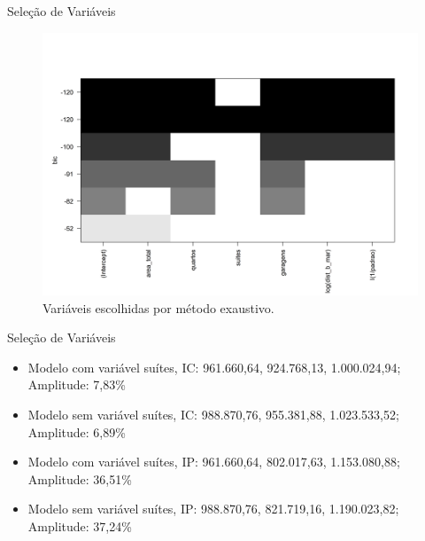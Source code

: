 \documentclass[9pt,ignorenonframetext,aspectratio=169]{beamer}
\providecommand{\tightlist}{%
  \setlength{\itemsep}{0pt}\setlength{\parskip}{0pt}}
\begin{document}
\begin{frame}{Seleção de Variáveis}
\protect\hypertarget{seleuxe7uxe3o-de-variuxe1veis-3}{}

\begin{figure}

{\centering \includegraphics[width=0.7\linewidth]{images/regsub-1} 

}

\caption{Variáveis escolhidas por método exaustivo.}\label{fig:regsub}
\end{figure}

\end{frame}

\begin{frame}{Seleção de Variáveis}
\protect\hypertarget{seleuxe7uxe3o-de-variuxe1veis-4}{}

\begin{itemize}[<+->]
\tightlist
\item
  Modelo com variável suítes, IC: 961.660,64, 924.768,13, 1.000.024,94;
  Amplitude: 7,83\%
\item
  Modelo sem variável suítes, IC: 988.870,76, 955.381,88, 1.023.533,52;
  Amplitude: 6,89\%
\item
  Modelo com variável suítes, IP: 961.660,64, 802.017,63, 1.153.080,88;
  Amplitude: 36,51\%
\item
  Modelo sem variável suítes, IP: 988.870,76, 821.719,16, 1.190.023,82;
  Amplitude: 37,24\%
\end{itemize}

\end{frame}
\end{document}
